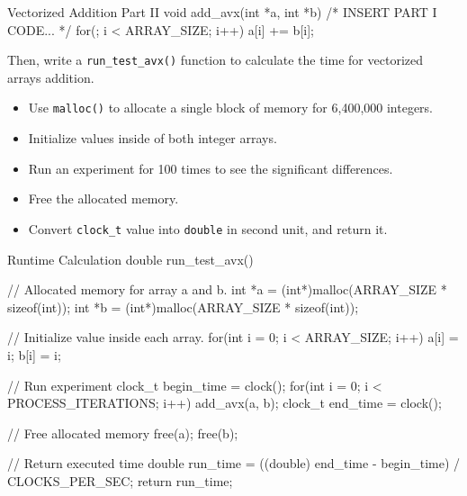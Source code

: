 \documentclass[12pt, a4paper]{article}
\begin{document}
            \begin{codeblock}[minted language=c]{Vectorized Addition Part II}
                void add_avx(int *a, int *b) {
                    /* INSERT PART I CODE... */
                    for(; i < ARRAY_SIZE; i++) {
                        a[i] += b[i];
                    }
                }
            \end{codeblock}

    \pagebreak

            Then, write a \texttt{run\_test\_avx()} function to calculate the time for vectorized arrays addition.
            \begin{itemize}
                \item Use \texttt{malloc()} to allocate a single block of memory for 6,400,000 integers.
                \item Initialize values inside of both integer arrays.
                \item Run an experiment for 100 times to see the significant differences.
                \item Free the allocated memory.
                \item Convert \texttt{clock\_t} value into \texttt{double} in second unit, and return it.
            \end{itemize}

            \begin{codeblock}[minted language=c]{Runtime Calculation}
                double run_test_avx() {
                    // Allocated memory for array a and b.
                    int *a = (int*)malloc(ARRAY_SIZE * sizeof(int));
                    int *b = (int*)malloc(ARRAY_SIZE * sizeof(int));

                    // Initialize value inside each array.
                    for(int i = 0; i < ARRAY_SIZE; i++) {
                        a[i] = i;
                        b[i] = i;
                    }

                    // Run experiment
                    clock_t begin_time = clock();
                    for(int i = 0; i < PROCESS_ITERATIONS; i++) {
                        add_avx(a, b);
                    }
                    clock_t end_time = clock();

                    // Free allocated memory
                    free(a);
                    free(b);

                    // Return executed time
                    double run_time = ((double) end_time - begin_time) / CLOCKS_PER_SEC;
                    return run_time;
                }
            \end{codeblock}
\end{document}
